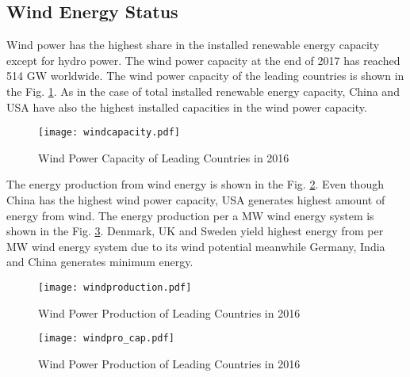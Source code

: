 \subsection{Wind Energy Status}
Wind power has the highest share in the installed renewable energy capacity except for hydro power. The wind power capacity at the end of 2017 has reached 514 GW worldwide\cite{InternationalRenewableEnergyAgencyIRENA2018}. The wind power capacity of the leading countries is shown in the Fig. \ref{windcap}. As in the case of total installed renewable energy capacity, China and USA have also the highest installed capacities in the wind power capacity. \par
\begin{figure}[h!]
	\centering
	\texttt{[image: windcapacity.pdf]}
	\caption{Wind Power Capacity of Leading Countries in 2016}
	\label{windcap}
\end{figure}
The energy production from wind energy is shown in the Fig. \ref{windpro}. Even though China has the highest wind power capacity,  USA generates highest amount of energy from wind. The energy production per a MW wind energy system is shown in the Fig. \ref{windpro_cap}. Denmark, UK and Sweden yield highest energy from per MW wind energy system due to its wind potential meanwhile Germany, India and China generates minimum energy.
\begin{figure}[h!]
	\centering
	\texttt{[image: windproduction.pdf]}
	\caption{Wind Power Production of Leading Countries in 2016}
	\label{windpro}
\end{figure}
\begin{figure}[h!]
	\centering
	\texttt{[image: windpro\_cap.pdf]}
	\caption{Wind Power Production of Leading Countries in 2016}
	\label{windpro_cap}
\end{figure}

